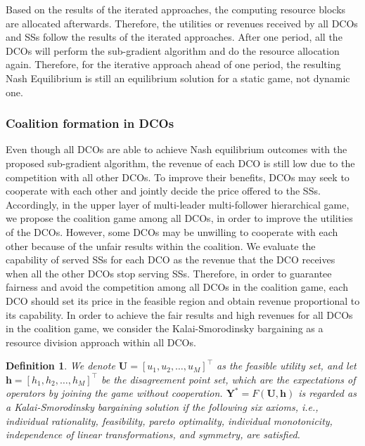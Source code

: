 \documentclass[twocolumn,10pt]{IEEEtran}
\newtheorem{definition}{Definition}
\begin{document}
Based on the results of the iterated approaches, the computing resource blocks are allocated afterwards. Therefore, the utilities or revenues received by all DCOs and SSs follow the results of the iterated approaches. After one period, all the DCOs will perform the sub-gradient algorithm and do the resource allocation again. Therefore, for the iterative approach ahead of one period, the resulting Nash Equilibrium is still an equilibrium solution for a static game, not dynamic one.


\subsubsection{Coalition formation in DCOs}

Even though all DCOs are able to achieve Nash equilibrium outcomes with the proposed sub-gradient algorithm, the revenue of each DCO is still low due to the competition with all other DCOs. To improve their benefits, DCOs may seek to cooperate with each other and jointly decide the price offered to the SSs. Accordingly, in the upper layer of multi-leader multi-follower hierarchical game, we propose the coalition game among all DCOs, in order to improve the utilities of the DCOs. However, some DCOs may be unwilling to cooperate with each other because of the unfair results within the coalition. We evaluate the capability of served SSs for each DCO as the revenue that the DCO receives when all the other DCOs stop serving SSs. Therefore, in order to guarantee fairness and avoid the competition among all DCOs in the coalition game, each DCO should set its price in the feasible region and obtain revenue proportional to its capability. In order to achieve the fair results and high revenues for all DCOs in the coalition game, we consider the Kalai-Smorodinsky bargaining as a resource division approach within all DCOs.



\begin{definition} \cite{HPark01}\cite{Huaqing01} \label{definition2}
We denote $\mathbf{U}=[u_{1},u_{2},\ldots, u_{M}]^\top$ as the feasible utility set, and let $\mathbf{h}=[h_{1},h_{2},\ldots, h_{M}]^\top$ be the disagreement point set, which are the expectations of operators by joining the game without cooperation. $\mathbf{Y}^*=F(\mathbf{U},\mathbf{h})$ is regarded as a Kalai-Smorodinsky bargaining solution if the following six axioms, i.e., individual rationality, feasibility, pareto optimality, individual monotonicity, independence of linear transformations, and symmetry, are satisfied.
\end{definition}
\end{document}
